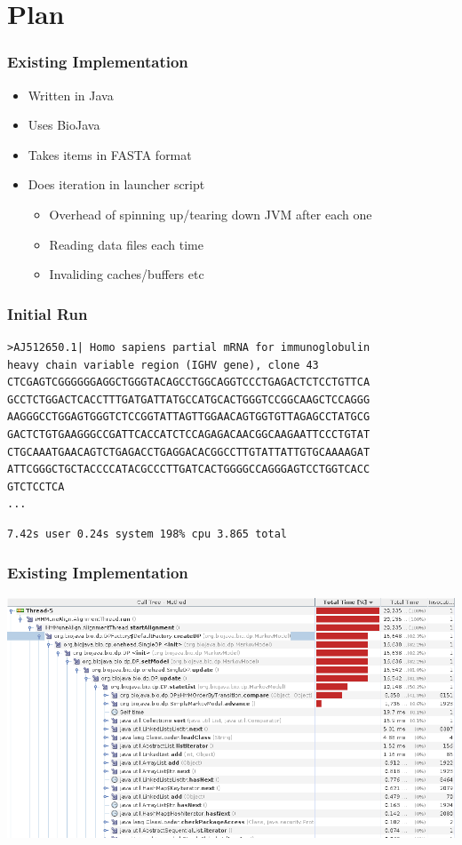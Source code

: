 \documentclass{beamer}
\begin{document}
\section{Plan}

\begin{frame}
\frametitle{Existing Implementation}
\begin{itemize}
 \item Written in Java
 \item Uses BioJava
 \item Takes items in FASTA format
 \item Does iteration in launcher script
 \begin{itemize}
  \item Overhead of spinning up/tearing down JVM after each one
  \item Reading data files each time
  \item Invaliding caches/buffers etc
 \end{itemize}
\end{itemize}
\end{frame}

\begin{frame}[fragile]
\frametitle{Initial Run}
\begin{verbatim}
>AJ512650.1| Homo sapiens partial mRNA for immunoglobulin
heavy chain variable region (IGHV gene), clone 43
CTCGAGTCGGGGGGAGGCTGGGTACAGCCTGGCAGGTCCCTGAGACTCTCCTGTTCA
GCCTCTGGACTCACCTTTGATGATTATGCCATGCACTGGGTCCGGCAAGCTCCAGGG
AAGGGCCTGGAGTGGGTCTCCGGTATTAGTTGGAACAGTGGTGTTAGAGCCTATGCG
GACTCTGTGAAGGGCCGATTCACCATCTCCAGAGACAACGGCAAGAATTCCCTGTAT
CTGCAAATGAACAGTCTGAGACCTGAGGACACGGCCTTGTATTATTGTGCAAAAGAT
ATTCGGGCTGCTACCCCATACGCCCTTGATCACTGGGGCCAGGGAGTCCTGGTCACC
GTCTCCTCA
...
\end{verbatim}
\begin{verbatim}
7.42s user 0.24s system 198% cpu 3.865 total
\end{verbatim}
\end{frame}

\begin{frame}
\frametitle{Existing Implementation}
\includegraphics[width=\textwidth]{profile.png}
\end{frame}
\end{document}
